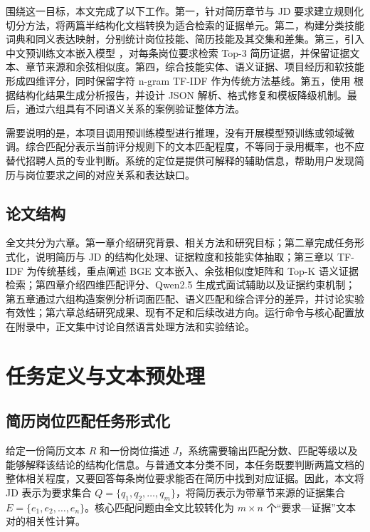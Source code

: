 \documentclass[UTF8,zihao=-4,a4paper,oneside]{ctexrep}
\begin{document}
围绕这一目标，本文完成了以下工作。第一，针对简历章节与 JD 要求建立规则化切分方法，将两篇半结构化文档转换为适合检索的证据单元。第二，构建分类技能词典和同义表达映射，分别统计岗位技能、简历技能及其交集和差集。第三，引入中文预训练文本嵌入模型 \texttt{}，对每条岗位要求检索 Top-3 简历证据，并保留证据文本、章节来源和余弦相似度。第四，综合技能实体、语义证据、项目经历和软技能形成四维评分，同时保留字符 n-gram TF-IDF 作为传统方法基线。第五，使用 \texttt{} 根据结构化结果生成分析报告，并设计 JSON 解析、格式修复和模板降级机制。最后，通过六组具有不同语义关系的案例验证整体方法。


需要说明的是，本项目调用预训练模型进行推理，没有开展模型预训练或领域微调。综合匹配分表示当前评分规则下的文本匹配程度，不等同于录用概率，也不应替代招聘人员的专业判断。系统的定位是提供可解释的辅助信息，帮助用户发现简历与岗位要求之间的对应关系和表达缺口。


\section{论文结构}


全文共分为六章。第一章介绍研究背景、相关方法和研究目标；第二章完成任务形式化，说明简历与 JD 的结构化处理、证据粒度和技能实体抽取；第三章以 TF-IDF 为传统基线，重点阐述 BGE 文本嵌入、余弦相似度矩阵和 Top-K 语义证据检索；第四章介绍四维匹配评分、Qwen2.5 生成式面试辅助以及证据约束机制；第五章通过六组构造案例分析词面匹配、语义匹配和综合评分的差异，并讨论实验有效性；第六章总结研究成果、现有不足和后续改进方向。运行命令与核心配置放在附录中，正文集中讨论自然语言处理方法和实验结论。


\chapter{任务定义与文本预处理}


\section{简历岗位匹配任务形式化}


给定一份简历文本 \(R\) 和一份岗位描述 \(J\)，系统需要输出匹配分数、匹配等级以及能够解释该结论的结构化信息。与普通文本分类不同，本任务既要判断两篇文档的整体相关程度，又要回答每条岗位要求能否在简历中找到对应证据。因此，本文将 JD 表示为要求集合 \(Q=\{q_1,q_2,\ldots,q_m\}\)，将简历表示为带章节来源的证据集合 \(E=\{e_1,e_2,\ldots,e_n\}\)。核心匹配问题由全文比较转化为 \(m\times n\) 个“要求—证据”文本对的相关性计算。
\end{document}

